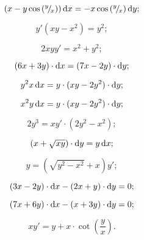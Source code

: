 \begin{multicols}{2}
\begin{problem}
	\[ \left( x - y \cos \left({}^{y}\!/_{\!x}\right)\right) \mathop{}\!\mathrm{d} x = - x \cos \left({}^{y}\!/_{\!x}\right) \mathop{}\!\mathrm{d} y; \]
\end{problem}
\begin{problem}
	\[ y' (xy - x^2) = y^2; \]
\end{problem}
\begin{problem}
	\[ 2xyy' = x^2 + y^2; \]
\end{problem}
\begin{problem}
	\[ (6x + 3y) \cdot \mathop{}\!\mathrm{d} x = (7x - 2y) \cdot \mathop{}\!\mathrm{d} y; \]
\end{problem}
\begin{problem}
	\[ y^2 x \mathop{}\!\mathrm{d} x = y \cdot (xy - 2y^2) \cdot \mathop{}\!\mathrm{d} y; \]
\end{problem}
\begin{problem}
	\[ x^2 y \mathop{}\!\mathrm{d} x = y \cdot (xy - 2y^2) \cdot \mathop{}\!\mathrm{d} y; \]
\end{problem}
\begin{problem}
	\[ 2y^3 = xy' \cdot (2y^2 - x^2); \]
\end{problem}
\begin{problem}
	\[ \left( x + \sqrt{xy}\right) \cdot \mathop{}\!\mathrm{d} y = y \mathop{}\!\mathrm{d} x; \]
\end{problem}
\begin{problem}
	\[ y = \left( \sqrt{y^2 - x^2} + x\right) y'; \]
\end{problem}
\begin{problem}
	\[ (3x - 2y) \cdot \mathop{}\!\mathrm{d} x - (2x + y) \cdot \mathop{}\!\mathrm{d} y = 0; \]
\end{problem}
\begin{problem}
	\[ (7x + 6y) \cdot \mathop{}\!\mathrm{d} x - (x + 3y) \cdot \mathop{}\!\mathrm{d} y = 0; \]
\end{problem}
\begin{problem}
	\[ xy' = y + x \cdot \cot \left(\frac{y}{x}\right). \]
\end{problem}
\end{multicols}

